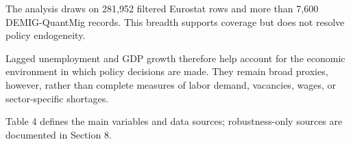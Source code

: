 \documentclass[11pt,a4paper]{article}
\begin{document}
The analysis draws on 281,952 filtered Eurostat rows and more than 7,600
DEMIG-QuantMig records. This breadth supports coverage but does not
resolve policy endogeneity.

Lagged unemployment and GDP growth therefore help account for the
economic environment in which policy decisions are made. They remain
broad proxies, however, rather than complete measures of labor demand,
vacancies, wages, or sector-specific shortages.

Table 4 defines the main variables and data sources; robustness-only
sources are documented in Section 8.

\clearpage
\noindent\begin{minipage}{\linewidth}
\label{tab:variables}
\end{minipage}
\end{document}
